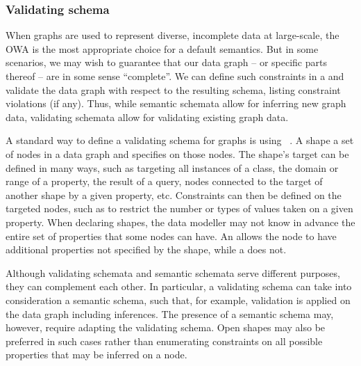 

\subsubsection{Validating schema}
When graphs are used to represent diverse, incomplete data at large-scale, the OWA is the most appropriate choice for a default semantics. But in some scenarios, we may wish to guarantee that our data graph – or specific parts thereof – are in some sense “complete”. We can define such constraints in a  and validate the data graph with respect to the resulting schema, listing constraint violations (if any). Thus, while semantic schemata allow for inferring new graph data, validating schemata allow for validating existing graph data. 

A standard way to define a validating schema for graphs is using ~\cite{Knublauch2017SHACL}\cite{LabraGayo2017ValidatingRDF}\cite{Prudhommeaux2014ShapeExpressions}. A shape  a set of nodes in a data graph and specifies  on those nodes. The shape’s target can be defined in many ways, such as targeting all instances of a class, the domain or range of a property, the result of a query, nodes connected to the target of another shape by a given property, etc. Constraints can then be defined on the targeted nodes, such as to restrict the number or types of values taken on a given property. When declaring shapes, the data modeller may not know in advance the entire set of properties that some nodes can have. An  allows the node to have additional properties not specified by the shape, while a  does not.

Although validating schemata and semantic schemata serve different purposes, they can complement each other. In particular, a validating schema can take into consideration a semantic schema, such that, for example, validation is applied on the data graph including inferences. The presence of a semantic schema may, however, require adapting the validating schema. Open shapes may also be preferred in such cases rather than enumerating constraints on all possible properties that may be inferred on a node.

